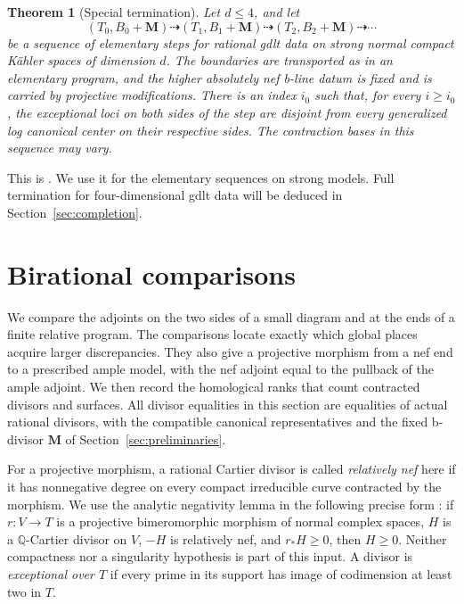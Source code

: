 \documentclass[11pt]{amsart}
\newtheorem{theorem}{Theorem}[section]
\theoremstyle{definition}
\theoremstyle{remark}
\numberwithin{equation}{section}
\newcommand{\Q}{\mathbb{Q}}
\newcommand{\M}{\mathbf{M}}
\begin{document}
\begin{theorem}[Special termination]\label{thm:special-termination}
Let \(d\leq4\), and let
\[
 (T_0,B_0+\M)\dashrightarrow(T_1,B_1+\M)
 \dashrightarrow(T_2,B_2+\M)\dashrightarrow\cdots
\]
be a sequence of elementary steps for rational gdlt data on strong normal
compact K\"ahler spaces of dimension \(d\).  The boundaries are transported
as in an elementary program, and the higher absolutely nef b-line datum is fixed and is
carried by projective modifications.  There is an index \(i_0\) such that,
for every \(i\geq i_0\), the exceptional loci on both sides of the step are
disjoint from every generalized log canonical center on their respective
sides.  The contraction bases in this sequence may vary.
\end{theorem}

This is \cite[Theorem~11.3]{KahlerAuxiliary}.  We use it for the elementary
sequences on strong models.  Full termination for four-dimensional gdlt
data will be deduced in Section~\ref{sec:completion}.

\section{Birational comparisons}
\label{sec:comparisons}

We compare the adjoints on the two sides of a small diagram and at the
ends of a finite relative program.  The comparisons locate exactly which
global places acquire larger discrepancies.  They also give a projective
morphism from a nef end to a prescribed ample model, with the nef adjoint
equal to the pullback of the ample adjoint.  We then record the homological
ranks that count contracted divisors and surfaces.
All divisor equalities in this section are equalities of actual rational
divisors, with the compatible canonical representatives and the fixed
b-divisor $\M$ of Section~\ref{sec:preliminaries}.

For a projective morphism, a rational Cartier divisor is called
\emph{relatively nef} here if it has nonnegative degree on every compact
irreducible curve contracted by the morphism.  We use the analytic
negativity lemma in the following precise form
\cite[Lemma~2.2]{CanonicalKahler}: if $r:V\to T$ is a projective
bimeromorphic morphism of normal complex spaces, $H$ is a
$\Q$-Cartier divisor on $V$, $-H$ is relatively nef, and $r_*H\geq0$,
then $H\geq0$.  Neither compactness nor a singularity hypothesis is
part of this input.  A divisor is \emph{exceptional over $T$} if every
prime in its support has image of codimension at least two in $T$.
\end{document}
